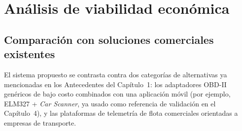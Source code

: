 \section{Análisis de viabilidad económica}

\subsection{Comparación con soluciones comerciales existentes}

El sistema propuesto se contrasta contra dos categorías de alternativas ya mencionadas en los Antecedentes del Capítulo~1: los adaptadores OBD-II genéricos de bajo costo combinados con una aplicación móvil (por ejemplo, ELM327 + \textit{Car Scanner}, ya usado como referencia de validación en el Capítulo~4), y las plataformas de telemetría de flota comerciales orientadas a empresas de transporte.

